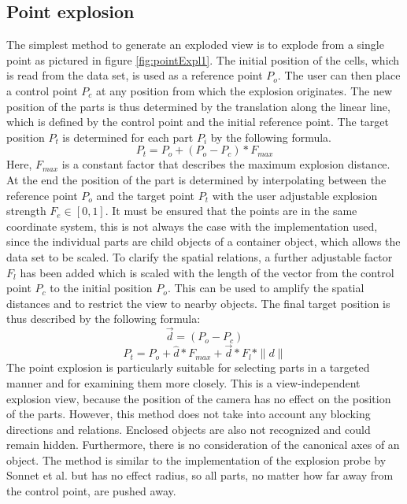 \subsection{Point explosion}
The simplest method to generate an exploded view is to explode from a single point as pictured in figure \ref{fig:pointExpl1}.
The initial position of the cells, which is read from the data set, is used as a reference point $P_o$. 
The user can then place a control point $P_c$ at any position from which the explosion originates. 
The new position of the parts is thus determined by the translation along the linear line, which is defined by the control point and the initial reference point.
The target position $P_t$ is determined for each part $P_i$ by the following formula. 
\begin{equation}
	P_t = P_o + (P_o - P_c) * F_{max}
	\label{eq:pointExpl1}
\end{equation}
Here, $F_{max}$ is a constant factor that describes the maximum explosion distance. At the end the position of the part is determined by interpolating between the reference point $P_o$ and the target point $P_t$ with the user adjustable explosion strength $F_e \in [0, 1]$.
It must be ensured that the points are in the same coordinate system, this is not always the case with the implementation used, since the individual parts are child objects of a container object, which allows the data set to be scaled.
To clarify the spatial relations, a further adjustable factor $F_l$ has been added which is scaled with the length of the vector from the control point $P_c$ to the initial position $P_o$. This can be used to amplify the spatial distances and to restrict the view to nearby objects.
The final target position is thus described by the following formula:
\begin{equation}
	\vec{d} = (P_o - P_c) 
	\label{eq:pointExpl2}
\end{equation}
\begin{equation} 
	P_t = P_o + \hat{d} * F_{max} + \vec{d} * F_l * \|d\|
	\label{eq:pointExpl3}
\end{equation}
The point explosion is particularly suitable for selecting parts in a targeted manner and for examining them more closely.
This is a view-independent explosion view, because the position of the camera has no effect on the position of the parts. 
However, this method does not take into account any blocking directions and relations. 
Enclosed objects are also not recognized and could remain hidden.
Furthermore, there is no consideration of the canonical axes of an object.
The method is similar to the implementation of the explosion probe by Sonnet et al.\cite{Sonnet_2004} but has no effect radius, so all parts, no matter how far away from the control point, are pushed away.

